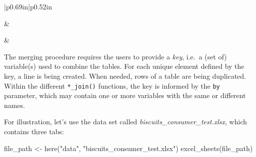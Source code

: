 \documentclass[
]{krantz}
\makeatletter
\newenvironment{Shaded}{\begin{snugshade}}{\end{snugshade}}
\newcommand{\FunctionTok}[1]{\textcolor[rgb]{0,0,0}{#1}}
\newcommand{\NormalTok}[1]{#1}
\newcommand{\OtherTok}[1]{\textcolor[rgb]{0.37,0.37,0.37}{#1}}
\newcommand{\StringTok}[1]{\textcolor[rgb]{0.5,0.5,0.5}{#1}}
\newenvironment{kframe}{%
\medskip{}
\setlength{\fboxsep}{.8em}
 \def\at@end@of@kframe{}%
 \ifinner\ifhmode%
  \def\at@end@of@kframe{\end{minipage}}%
  \begin{minipage}{\columnwidth}%
 \fi\fi%
 \def\FrameCommand##1{\hskip\@totalleftmargin \hskip-\fboxsep
 \colorbox{shadecolor}{##1}\hskip-\fboxsep
     \hskip-\linewidth \hskip-\@totalleftmargin \hskip\columnwidth}%
 \MakeFramed {\advance\hsize-\width
   \@totalleftmargin\z@ \linewidth\hsize
   \@setminipage}}%
 {\par\unskip\endMakeFramed%
 \at@end@of@kframe}
\renewenvironment{Shaded}{\begin{kframe}}{\end{kframe}}
\makeatother
\begin{document}
\begin{longtable}[c]{|p{0.69in}|p{0.52in}}




 &  \\

\endhead



 &  \\




\end{longtable}

The merging procedure requires the users to provide a \emph{key}, i.e.~a (set of) variable(s) used to combine the tables. For each unique element defined by the key, a line is being created. When needed, rows of a table are being duplicated. Within the different \texttt{*\_join()} functions, the key is informed by the \texttt{by} parameter, which may contain one or more variables with the same or different names.

For illustration, let's use the data set called \emph{biscuits\_consumer\_test.xlsx}, which contains three tabs:

\begin{Shaded}
\begin{Highlighting}[]
\NormalTok{file\_path }\OtherTok{\textless{}{-}} \FunctionTok{here}\NormalTok{(}\StringTok{"data"}\NormalTok{, }\StringTok{"biscuits\_consumer\_test.xlsx"}\NormalTok{)}
\FunctionTok{excel\_sheets}\NormalTok{(file\_path)}
\end{Highlighting}
\end{Shaded}
\end{document}
